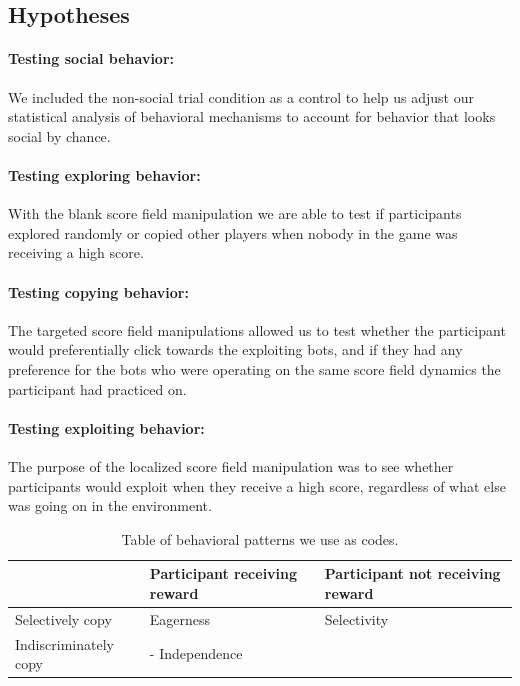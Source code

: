 \documentclass[12pt,letterpaper]{article}
\begin{document}

\subsection{Hypotheses}

\paragraph{Testing social behavior:} We included the non-social trial condition as a control to help us adjust our statistical analysis of behavioral mechanisms to account for behavior that looks social by chance. 

\paragraph{Testing exploring behavior:}  With the blank score field manipulation we are able to test if participants explored randomly or copied other players when nobody in the game was receiving a high score. 

\paragraph{Testing copying behavior:}  The targeted score field manipulations allowed us to test whether the participant would preferentially click towards the exploiting bots, and if they had any preference for the bots who were operating on the same score field dynamics the participant had practiced on.

\paragraph{Testing exploiting behavior:}  The purpose of the localized score field manipulation was to see whether participants would exploit when they receive a high score, regardless of what else was going on in the environment.

\begin{table}[]
\begin{tabular}{l|l|l}
                      & Participant receiving reward & Participant not receiving reward  \\ \hline
Selectively copy  & Eagerness                  & \multicolumn{1}{l|}{Selectivity} \\ \hline
Indiscriminately copy &  \multicolumn{2}{l|}{ - Independence}  \\ \cline{1-3} 
\end{tabular}
\caption{Table of behavioral patterns we use as codes.}
\end{table}
\end{document}

